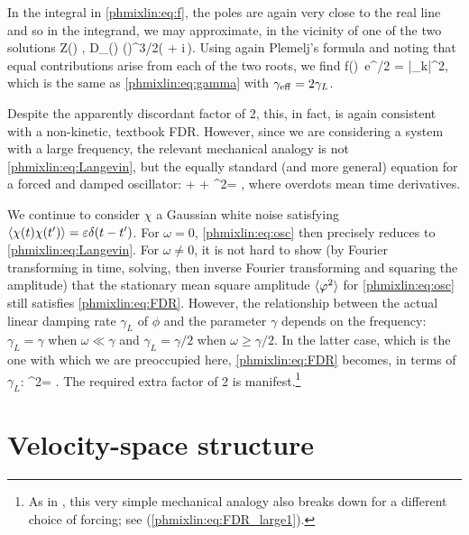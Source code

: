In the integral in \eqref{phmixlin:eq:f}, the poles are again very close to the real line 
and so in the integrand, we may approximate, in the vicinity of one of the 
two solutions  
\beq
Z(\zeta) \approx \mp {},\quad
D_\alpha(\zeta) \approx \pm \lt(\rt)^{3/2}\lt(\zeta \mp {} + i\,\rt). 
\eeq
Using again Plemelj's formula and noting that equal contributions arise from each 
of the two roots, we find 
\beq
f(\alpha) \sqrt{\pi}\,e^{\alpha/2} 
= 
\quad\Rightarrow\quad
\la|\phi_k|^2\ra \approx {}, 
\eeq
which is the same as \eqref{phmixlin:eq:gamma} with $\gamma_{\rm eff} = 2\gamma_L$. 

Despite the apparently discordant factor of 2, this, in fact, is again 
consistent with a non-kinetic, textbook FDR. However, since we are considering a system with 
a large frequency, the relevant mechanical analogy is not \eqref{phmixlin:eq:Langevin}, but 
the equally standard (and more general) equation for a forced and damped oscillator: 
\beq
\ddot\phi + \gamma\dot\phi + \omega^2\phi = \dot\chi,
\label{phmixlin:eq:osc}
\eeq 
where overdots mean time derivatives.

We continue to consider $\chi$ a Gaussian white noise satisfying 
$\langle\chi(t)\chi(t')\rangle = \varepsilon\delta(t-t')$.
For $\omega=0$, \eqref{phmixlin:eq:osc} then precisely reduces to \eqref{phmixlin:eq:Langevin}. 
For $\omega\neq0$, it is not hard to show (by Fourier transforming in time, 
solving, then inverse Fourier transforming and squaring the amplitude) that 
the stationary mean square amplitude $\langle\varphi^2\rangle$ for \eqref{phmixlin:eq:osc} 
still satisfies \eqref{phmixlin:eq:FDR}. 
However, the relationship between the actual linear damping rate $\gamma_L$ 
of $\phi$ and the parameter $\gamma$ depends on the frequency: 
$\gamma_L = \gamma$ when $\omega\ll\gamma$ and $\gamma_L=\gamma/2$ when $\omega\ge\gamma/2$.  
In the latter case, which is the one with which we are preoccupied here, 
\eqref{phmixlin:eq:FDR} becomes, in terms of $\gamma_L$:  
\beq
\la\phi^2\ra = .
\label{phmixlin:eq:FDR_osc}
\eeq
The required extra factor of 2 is manifest.\footnote{As in , 
this very simple mechanical analogy also breaks down for a different choice of forcing; 
see  (\eqref{phmixlin:eq:FDR_large1}).}  


\section{Velocity-space structure}
\label{phmixlin:sec:Hermite}

